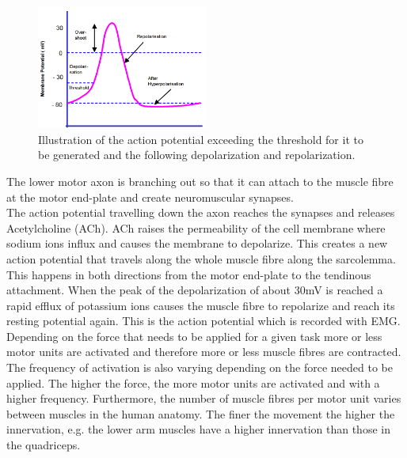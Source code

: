 \begin{figure}[H]
	\includegraphics[width=0.5\textwidth]{figures/Anatomy/action_potential}  %
	\caption{Illustration of the action potential exceeding the threshold for it to be generated and the following depolarization and repolarization. \cite{konrad2005}}
	\label{fig:action_potential}  %
\end{figure}

The lower motor axon is branching out so that it can attach to the muscle fibre at the motor end-plate and create neuromuscular synapses. \\
The action potential travelling down the axon reaches the synapses and releases Acetylcholine (ACh). ACh raises the permeability of the cell membrane where sodium ions influx and causes the membrane to depolarize. 
This creates a new action potential that travels along the whole muscle fibre along the sarcolemma.
This happens in both directions from the motor end-plate to the tendinous attachment. When the peak of the depolarization of about 30mV is reached a rapid efflux of potassium ions causes the muscle fibre to repolarize and reach its resting potential again. This is the action potential which is recorded with EMG. \cite{cram2012}\\
Depending on the force that needs to be applied for a given task more or less motor units are activated and therefore more or less muscle fibres are contracted. The frequency of activation is also varying depending on the force needed to be applied. The higher the force, the more motor units are activated and with a higher frequency. Furthermore, the number of muscle fibres per motor unit varies between muscles in the human anatomy. The finer the movement the higher the innervation, e.g. the lower arm muscles have a higher innervation than those in the quadriceps. \cite{cram2012}

